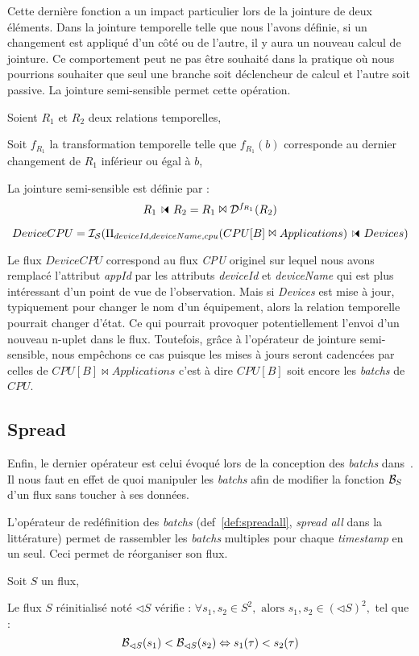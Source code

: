 Cette dernière fonction a un impact particulier lors de la jointure de deux éléments. Dans la jointure temporelle telle que nous l'avons définie, si un changement est appliqué d'un côté ou de l'autre, il y aura un nouveau calcul de jointure. Ce comportement peut ne pas être souhaité dans la pratique où nous pourrions souhaiter que seul une branche soit déclencheur de calcul et l'autre soit passive. La jointure semi-sensible permet cette opération.


\begin{defi}
    Soient $R_1$ et $R_2$ deux relations temporelles,

    Soit $f_{R_1}$ la transformation temporelle telle que $f_{R_1}(b)$ corresponde au dernier changement de $R_1$ inférieur ou égal à $b$,

    La jointure semi-sensible est définie par :
        $$R_1\ssjoin R_2 = R_1 \Join \D^{f_{R_1}}(R_2)$$
\end{defi}
\begin{example}
    $$DeviceCPU=\IS(\Pi_{deviceId,deviceName,cpu}(CPU[B]\Join Applications)\ssjoin Devices)$$

Le flux $DeviceCPU$ correspond au flux \textit{CPU} originel sur lequel nous avons remplacé l'attribut \textit{appId} par les attributs \textit{deviceId} et \textit{deviceName} qui est plus intéressant d'un point de vue de l'observation. Mais si \textit{Devices} est mise à jour, typiquement pour changer le nom d'un équipement, alors la relation temporelle pourrait changer d'état. Ce qui pourrait provoquer potentiellement l'envoi d'un nouveau n-uplet dans le flux. Toutefois, grâce à l'opérateur de jointure semi-sensible, nous empêchons ce cas puisque les mises à jours seront cadencées par celles de $CPU[B]\Join Applications$ c'est à dire $CPU[B]$ soit encore les \textit{batchs} de $CPU$.
\end{example}

\subsection{Spread}
Enfin, le dernier opérateur est celui évoqué lors de la conception des \textit{batchs} dans~\cite{Jain:spread}. Il nous faut en effet de quoi manipuler les \textit{batchs} afin de modifier la fonction $\mathcal{B}_S$ d'un flux sans toucher à ses données.

L'opérateur de redéfinition des \textit{batchs} (def~\ref{def:spreadall}, \textit{spread all} dans la littérature) permet de rassembler les \textit{batchs} multiples pour chaque \textit{timestamp} en un seul. Ceci permet de réorganiser son flux.
\begin{defi}\label{def:spreadall}
Soit $S$ un flux,

Le flux $S$ réinitialisé noté $\lhd S$ vérifie :
$\forall s_1, s_2\in S^2, \textrm{ alors } s_1, s_2 \in (\lhd S)^2,$ tel que :
$$\mathcal{B}_{\lhd S}(s_1) < \mathcal{B}_{\lhd S}(s_2) \Leftrightarrow s_1(\tau) < s_2(\tau)$$
\end{defi}

